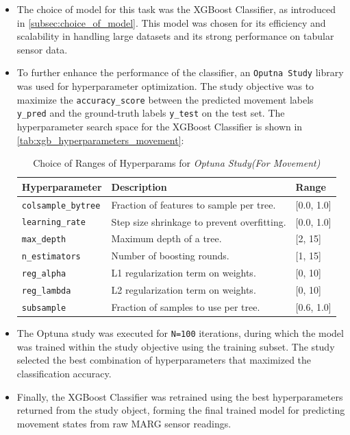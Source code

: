 \documentclass{iutbscthesis}
\begin{document}
\begin{itemize}
    \item The choice of model for this task was the XGBoost Classifier, as introduced in \autoref{subsec:choice_of_model}. This model was chosen for its efficiency and scalability in handling large datasets and its strong performance on tabular sensor data.

    \item To further enhance the performance of the classifier, an \verb|Oputna Study| library\cite{akiba2019optuna} was used for hyperparameter optimization. The study objective was to maximize the \texttt{accuracy\_score}\cite{labatut2012accuracy} between the predicted movement labels \texttt{y\_pred} and the ground-truth labels \texttt{y\_test} on the test set. The hyperparameter search space for the XGBoost Classifier is shown in \autoref{tab:xgb_hyperparameters_movement}:
    \begin{table}[H]
    \centering
    \caption{Choice of Ranges of Hyperparams for \textit{Optuna Study(For Movement)} }
    \label{tab:xgb_hyperparameters_movement}
        \begin{tabular}{|l|l|l|}
        \hline
            \textbf{Hyperparameter} & \textbf{Description} & \textbf{Range} \\ \hline
            \texttt{colsample\_bytree} & Fraction of features to sample per tree. & [0.0, 1.0] \\ \hline
            \texttt{learning\_rate} & Step size shrinkage to prevent overfitting. & [0.0, 1.0] \\ \hline
            \texttt{max\_depth} & Maximum depth of a tree. & [2, 15] \\ \hline
            \texttt{n\_estimators} & Number of boosting rounds. & [1, 15] \\ \hline
            \texttt{reg\_alpha} & L1 regularization term on weights. & [0, 10] \\ \hline
            \texttt{reg\_lambda} & L2 regularization term on weights. & [0, 10] \\ \hline
            \texttt{subsample} & Fraction of samples to use per tree. & [0.6, 1.0] \\ \hline
        \end{tabular}
    \end{table}

    \item The Optuna study was executed for \texttt{N=100} iterations, during which the model was trained within the study objective using the training subset. The study selected the best combination of hyperparameters that maximized the classification accuracy.
    \item Finally, the XGBoost Classifier was retrained using the best hyperparameters returned from the study object, forming the final trained model for predicting movement states from raw MARG sensor readings.
\end{itemize}
\end{document}
